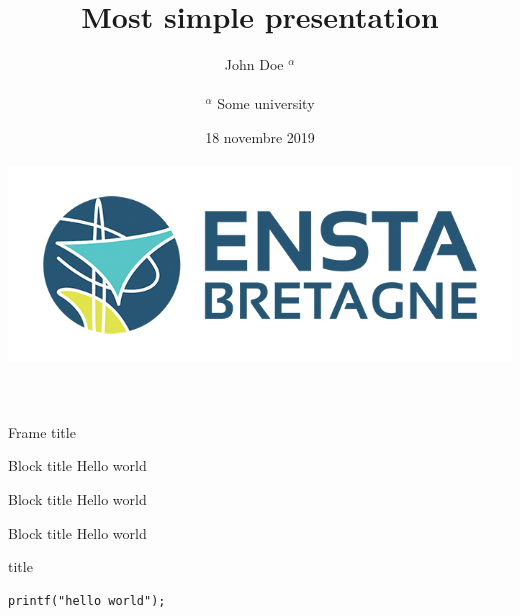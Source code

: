 \documentclass[aspectratio=169]{beamer}
\begin{document}
\title{Most simple presentation}
\author{John Doe $^{\alpha}$\\~\\
\small{$^{\alpha}$ Some university}} 
\date{18 novembre 2019\\~\\\includegraphics[width=.5\textwidth]{images/ensta-couleur}} 
\frame[plain]{\titlepage} 

\begin{frame}{Frame title}
\begin{exampleblock}{Block title}
Hello world
\end{exampleblock}
\begin{block}{Block title}
Hello world 
\end{block}
\begin{alertblock}{Block title}
Hello world \cite{Feynman1941}
\end{alertblock}
\end{frame}
\begin{frame}
\printbibliography
\end{frame}
\begin{frame}[fragile]{title}
\begin{verbatim}
printf("hello world");
\end{verbatim}
\end{frame}
\end{document}

